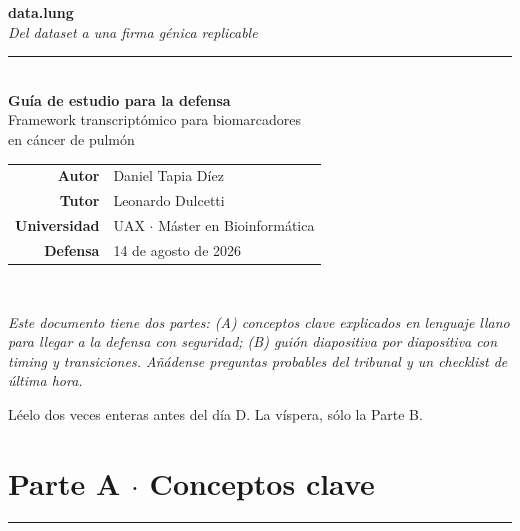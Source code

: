 \documentclass[11pt, a4paper]{article}
\begin{document}
\thispagestyle{empty}
\vspace*{2cm}
\begin{center}
  {\ttfamily\fontsize{48pt}{48pt}\selectfont\bfseries
   data\textcolor{verdeTerm}{.}lung}\\[0.2cm]
  {\itshape\large\color{tinta2}Del dataset a una firma g\'enica replicable}\\[0.8cm]

  \textcolor{verdeTerm}{\rule{3cm}{2pt}}\\[0.6cm]

  {\LARGE\bfseries Gu\'ia de estudio para la defensa}\\[0.4cm]
  {\Large\color{tinta2}Framework transcript\'omico para biomarcadores\\en c\'ancer de pulm\'on}\\[1.5cm]

  \begin{tabular}{rl}
    \color{mute}\textbf{Autor}      & Daniel Tapia D\'iez \\
    \color{mute}\textbf{Tutor}      & Leonardo Dulcetti \\
    \color{mute}\textbf{Universidad}& UAX $\cdot$ M\'aster en Bioinform\'atica \\
    \color{mute}\textbf{Defensa}    & 14 de agosto de 2026 \\
  \end{tabular}\\[2cm]

  \begin{tcolorbox}[colback=plano, colframe=verdeTerm, width=0.85\textwidth,
                    arc=3pt, boxrule=1pt]
    \small\itshape
    Este documento tiene dos partes: (A) conceptos clave explicados en lenguaje llano
    para llegar a la defensa con seguridad; (B) gui\'on diapositiva por diapositiva
    con timing y transiciones. A\~n\'adense preguntas probables del tribunal y un
    checklist de \'ultima hora.
  \end{tcolorbox}

  \vfill
  {\ttfamily\small\color{mute}L\'eelo dos veces enteras antes del d\'ia D. La v\'ispera, s\'olo la Parte B.}
\end{center}
\newpage

\tableofcontents
\newpage

\section*{Parte A $\cdot$ Conceptos clave}
{\color{verdeTerm}\rule{2.5cm}{2pt}}
\end{document}
